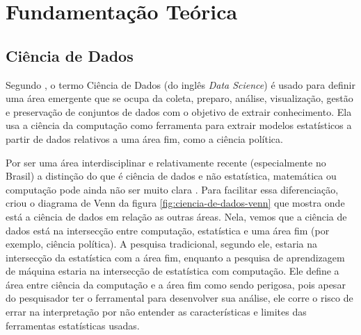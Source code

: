 \documentclass[a4paper,titlepage]{ppgi}\usepackage[]{graphicx}\usepackage[]{color}
\begin{document}
%
%






\chapter{Fundamentação Teórica}\label{cap:fundamentacao}

\section{Ciência de Dados}

Segundo , o termo Ciência de Dados (do inglês
\emph{Data Science}) é usado para definir uma área emergente que se ocupa da
coleta, preparo, análise, visualização, gestão e preservação de conjuntos de
dados com o objetivo de extrair conhecimento. Ela usa a ciência da computação
como ferramenta para extrair modelos estatísticos a partir de dados relativos a
uma área fim, como a ciência política.

Por ser uma área interdisciplinar e relativamente recente (especialmente no
Brasil) a distinção do que é ciência de dados e não estatística, matemática ou
computação pode ainda não ser muito clara \cite{Porto2014}. Para facilitar essa
diferenciação,  criou o diagrama de Venn da figura
\ref{fig:ciencia-de-dados-venn} que mostra onde está a ciência de dados em
relação as outras áreas. Nela, vemos que a ciência de dados está na intersecção
entre computação, estatística e uma área fim (por exemplo, ciência política). A
pesquisa tradicional, segundo ele, estaria na intersecção da estatística com a
área fim, enquanto a pesquisa de aprendizagem de máquina estaria na intersecção
de estatística com computação. Ele define a área entre ciência da computação e
a área fim como sendo perigosa, pois apesar do pesquisador ter o ferramental
para desenvolver sua análise, ele corre o risco de errar na interpretação por
não entender as características e limites das ferramentas estatísticas usadas.
\end{document}
